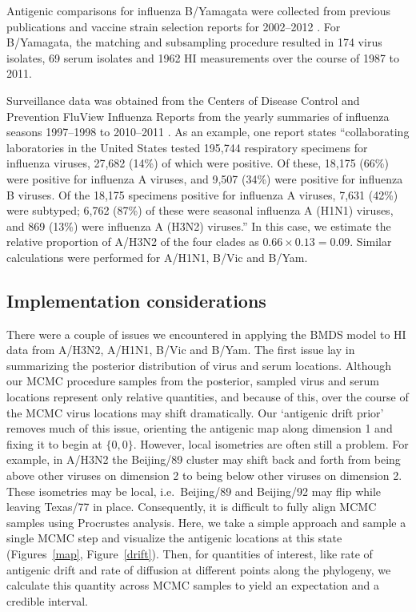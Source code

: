 \documentclass[11pt,oneside,letterpaper]{article}
\begin{document}
Antigenic comparisons for influenza B/Yamagata were collected from previous publications \cite{Rota90, Kanegae90, Nakajima92, Nerome98, Hay01, Muyanga01, Nakagawa02, Abed03, Ansaldi03, Ansaldi04, Matsuzaki04, Puzelli04, Shaw02, Xu04, Barr06, Daum06, Lin07} and vaccine strain selection reports for 2002--2012 \cite{AusWHO06, NIMR02, NIMR03, NIMR04, NIMRFeb05, NIMRSep05, NIMRMarch06, NIMRSep06, NIMRMarch07, NIMRSep07, NIMRMarch08, NIMRFeb09, NIMRSep09, NIMRFeb10, NIMRSep10, NIMRFeb11, NIMRSep11, NIMRFeb12}.
For B/Yamagata, the matching and subsampling procedure resulted in 174 virus isolates, 69 serum isolates and 1962 HI measurements over the course of 1987 to 2011.

Surveillance data was obtained from the Centers of Disease Control and Prevention FluView Influenza Reports from the yearly summaries of influenza seasons 1997--1998 to 2010--2011 \cite{CDCReports}.
As an example, one report states ``collaborating laboratories in the United States tested 195,744 respiratory specimens for influenza viruses, 27,682 (14\%) of which were positive. Of these, 18,175 (66\%) were positive for influenza A viruses, and 9,507 (34\%) were positive for influenza B viruses. Of the 18,175 specimens positive for influenza A viruses, 7,631 (42\%) were subtyped; 6,762 (87\%) of these were seasonal influenza A (H1N1) viruses, and 869 (13\%) were influenza A (H3N2) viruses.''
In this case, we estimate the relative proportion of A/H3N2 of the four clades as $0.66 \times 0.13 = 0.09$.
Similar calculations were performed for A/H1N1, B/Vic and B/Yam.

\subsection*{Implementation considerations}

There were a couple of issues we encountered in applying the BMDS model to HI data from A/H3N2, A/H1N1, B/Vic and B/Yam.
The first issue lay in summarizing the posterior distribution of virus and serum locations.
Although our MCMC procedure samples from the posterior, sampled virus and serum locations represent only relative quantities, and because of this, over the course of the MCMC virus locations may shift dramatically.
Our `antigenic drift prior' removes much of this issue, orienting the antigenic map along dimension 1 and fixing it to begin at $\{0,0\}$.
However, local isometries are often still a problem.
For example, in A/H3N2 the Beijing/89 cluster may shift back and forth from being above other viruses on dimension 2 to being below other viruses on dimension 2.
These isometries may be local, i.e.\ Beijing/89 and Beijing/92 may flip while leaving Texas/77 in place.
Consequently, it is difficult to fully align MCMC samples using Procrustes analysis.
Here, we take a simple approach and sample a single MCMC step and visualize the antigenic locations at this state (Figures~\ref{map}, Figure~\ref{drift}).
Then, for quantities of interest, like rate of antigenic drift and rate of diffusion at different points along the phylogeny, we calculate this quantity across MCMC samples to yield an expectation and a credible interval.
\end{document}
